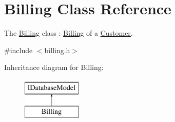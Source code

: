 \hypertarget{classBilling}{\section{Billing Class Reference}
\label{classBilling}
}


The \hyperlink{classBilling}{Billing} class \+: \hyperlink{classBilling}{Billing} of a \hyperlink{classCustomer}{Customer}.  




{\ttfamily \#include $<$billing.\+h$>$}

Inheritance diagram for Billing\+:\begin{figure}[H]
\begin{center}
\leavevmode
\includegraphics[height=2.000000cm]{df/d81/classBilling}
\end{center}
\end{figure}
